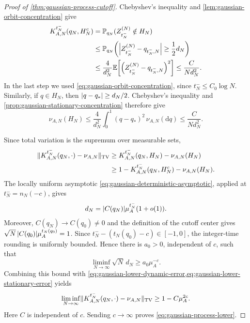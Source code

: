 \documentclass[11pt,reqno,a4paper]{article}
\newcommand{\Pp}{\P}
\newcommand{\Ee}{\E}
\newcommand{\TV}{\mathrm{TV}}
\begin{document}
\begin{proof}[Proof of \cref{thm:gaussian-process-cutoff}]
  Chebyshev's inequality and \cref{lem:gaussian-orbit-concentration} give
  \begin{align}
    K_{A,N}^{t_N^-}(q_N,H_N^c)
    &=
    \Pp_{q_N}(Z_{t_N^-}^{(N)}\notin H_N)
    \notag\\
    &\leq
    \Pp_{q_N}\left(
      \abs{Z_{t_N^-}^{(N)}-q_{t_N^-,N}}\geq \frac12 d_N
    \right)
    \notag\\
    &\leq
    \frac{4}{d_N^2}
    \Ee\left[
      \left(Z_{t_N^-}^{(N)}-q_{t_N^-,N}\right)^2
    \right]
    \leq
    \frac{C}{N d_N^2}.
    \label{eq:gaussian-lower-dynamic-error}
  \end{align}
  In the last step we used \cref{eq:gaussian-orbit-concentration}, since
  $t_N^-\leq C_0\log N$.
  Similarly, if $q\in H_N$, then $\abs{q-q_\ast}\geq d_N/2$. Chebyshev's
  inequality and \cref{prop:gaussian-stationary-concentration} therefore give
  \begin{equation}\label{eq:gaussian-lower-stationary-error}
    \nu_{A,N}(H_N)
    \leq
    \frac{4}{d_N^2}
    \int_0^1(q-q_\ast)^2\,\nu_{A,N}(\mathrm{d}q)
    \leq
    \frac{C}{N d_N^2}.
  \end{equation}

  Since total variation is the supremum over measurable sets,
  \begin{align*}
    \norm{
      K_{A,N}^{t_N^-}(q_N,\cdot)-\nu_{A,N}
    }_{\TV}
    &\geq
    K_{A,N}^{t_N^-}(q_N,H_N)-\nu_{A,N}(H_N)  \\
    &\geq
    1
    -
    K_{A,N}^{t_N^-}(q_N,H_N^c)
    -
    \nu_{A,N}(H_N).
  \end{align*}
  The locally
  uniform asymptotic \cref{eq:gaussian-deterministic-asymptotic}, applied at
  $t_N^-=n_N(-c)$, gives
  \begin{equation*}
    d_N
    =
    \abs{C(q_N)}\mu_A^{t_N^-}(1+o(1)).
  \end{equation*}
  Moreover, $C(q_N)\to C(q_0)\neq0$ and the definition of the cutoff center
  gives
  $\sqrt N\,\abs{C(q_0)}\mu_A^{t_N(q_0)}=1$. Since
  $t_N^--(t_N(q_0)-c)\in[-1,0]$, the integer-time rounding is uniformly
  bounded. Hence there is $a_0>0$, independent of $c$, such that
  \begin{equation*}
    \liminf_{N\to\infty}\sqrt N\,d_N
    \geq
    a_0\mu_A^{-c}.
  \end{equation*}
  Combining this bound with
  \cref{eq:gaussian-lower-dynamic-error,eq:gaussian-lower-stationary-error}
  yields
  \begin{equation*}
    \liminf_{N\to\infty}
    \norm{
      K_{A,N}^{t_N^-}(q_N,\cdot)-\nu_{A,N}
    }_{\TV}
    \geq
    1-C\mu_A^{2c}.
  \end{equation*}
  Here $C$ is independent of $c$.
  Sending $c\to\infty$ proves \cref{eq:gaussian-process-lower}.


\end{proof}
\end{document}
